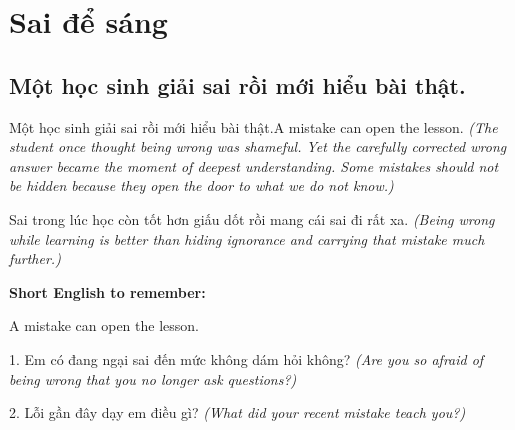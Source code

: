 \chapter{Sai để sáng}

\section{Một học sinh giải sai rồi mới hiểu bài thật.}
\begin{truyen}{Một học sinh giải sai rồi mới hiểu bài thật.}{A mistake can open the lesson.}
\textit{(The student once thought being wrong was shameful. Yet the carefully corrected wrong answer became the moment of deepest understanding. Some mistakes should not be hidden because they open the door to what we do not know.)}
\end{truyen}
\begin{baihoc}
Sai trong lúc học còn tốt hơn giấu dốt rồi mang cái sai đi rất xa.
\textit{(Being wrong while learning is better than hiding ignorance and carrying that mistake much further.)}
\end{baihoc}
\begin{ghinhoanh}\textbf{Short English to remember:}

A mistake can open the lesson.
\end{ghinhoanh}
\begin{tuhocnhanh}
1. Em có đang ngại sai đến mức không dám hỏi không? \textit{(Are you so afraid of being wrong that you no longer ask questions?)}

2. Lỗi gần đây dạy em điều gì? \textit{(What did your recent mistake teach you?)}
\end{tuhocnhanh}
\ngancach

